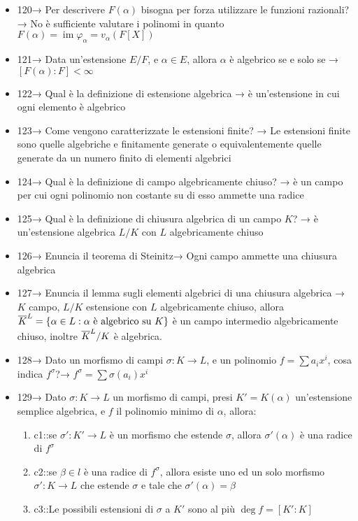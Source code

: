 \documentclass[A4,12pt]{article}
\begin{document}
\begin{itemize}[noitemsep]
		\item 120→ Per descrivere $ F(\alpha) $ bisogna per forza utilizzare le funzioni razionali? → No è sufficiente valutare i polinomi in quanto $ F(\alpha) = \operatorname{im} \varphi_\alpha = v_\alpha (F[X])$
		\item 121→ Data un'estensione $E/F$, e $\alpha \in E$, allora $\alpha $ è algebrico se e solo se → $[F(\alpha):F]<\infty$ 
		\item 122→ Qual è la definizione di estensione algebrica → è un'estensione in cui ogni elemento è algebrico
		\item 123→ Come vengono caratterizzate le estensioni finite? → Le estensioni finite sono quelle algebriche e finitamente generate o equivalentemente quelle generate da un numero finito di elementi algebrici
		\item 124→ Qual è la definizione di campo algebricamente chiuso? → è un campo per cui ogni polinomio non costante su di esso ammette una radice
		\item 125→ Qual è la definizione di chiusura algebrica di un campo $K$? → è un'estensione algebrica $L/K$ con $L$ algebricamente chiuso
		\item 126→ Enuncia il teorema di Steinitz→ Ogni campo ammette una chiusura algebrica
		\item 127→ Enuncia il lemma sugli elementi algebrici di una chiusura algebrica → $K$ campo, $L/K$ estensione con $L$ algebricamente chiuso, allora $\overline{K}\strut^{L} = \{\alpha \in L: \alpha \text{ è algebrico su } K\}$ è un campo intermedio algebricamente chiuso, inoltre $ \overline{K}\strut^{L}/K $ è algebrica.
		\item 128→ Dato un morfismo di campi $ \sigma: K\to L $, e un polinomio $ f=\sum a_ix^i $, cosa indica $ f^\sigma $?→ $ f^\sigma = \sum \sigma(a_i)x^i $ 
		\item 129→ Dato $ \sigma:K\to L $ un morfismo di campi, presi $ K'=K(\alpha) $ un'estensione semplice algebrica, e $ f $ il polinomio minimo di $ \alpha $, allora: \begin{enumerate}
			\item {{c1::se $ \sigma':K'\to L $ è un morfismo che estende $ \sigma $, allora $ \sigma'(\alpha) $ è una radice di $ f^\sigma $}}
			\item {{c2::se $ \beta \in l$ è una radice di $ f^\sigma $, allora esiste uno ed un solo morfismo $ \sigma':K\to L $ che estende $ \sigma $ e tale che $ \sigma'(\alpha) = \beta $}}
			\item {{c3::Le possibili estensioni di $ \sigma $ a $ K' $ sono al più $ \deg f = [K':K] $}}

\end{enumerate}
\end{itemize}
\end{document}
